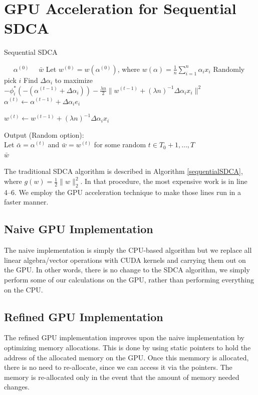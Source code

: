 \documentclass{article}
\begin{document}
\section{GPU Acceleration for Sequential SDCA}
\begin{algorithm}[H]
	\caption{Sequential SDCA}
	\label{sequentialSDCA}
	\begin{algorithmic}[1]
	\REQUIRE~~ $\alpha^{(0)}$
		\ENSURE~~$\bar{w}$
		\STATE Let $w^{(0)}=w(\alpha^{(0)})$, where $w(\alpha)=\frac{1}{n}\sum_{i=1}^{n}\alpha_ix_i$
		\STATE Randomly pick $i$
		\STATE Find $\Delta\alpha_i$ to maximize $-\phi_i^*(-(\alpha^{(t-1)}+\Delta\alpha_i))-\frac{\lambda n}{2}\|w^{(t-1)}+(\lambda n)^{-1}\Delta \alpha_i x_i\|^2$
		\STATE $\alpha^{(t)}\leftarrow\alpha^{(t-1)}+\Delta\alpha_ie_i$
		
		\STATE $w^{(t)}\leftarrow w^{(t-1)}+(\lambda n)^{-1}\Delta\alpha_i x_i$
		\ENDFOR
		
		\STATE Output (Random option):\\
		Let $\bar{\alpha}=\alpha^{(t)}$ and $\bar{w}=w^{(t)}$ for some random $t\in T_0+1,\ldots,T$\\
		\RETURN $\bar{w}$
		
	\end{algorithmic}
\end{algorithm}
The traditional SDCA algorithm \cite{shalev2013stochastic} is described in
Algorithm \ref{sequentialSDCA}, where $g(w)=\frac{1}{2}\|w\|_2^2$.  In that
procedure, the most expensive work is in line 4--6. We employ the GPU
acceleration technique to make those lines run in a faster manner.

\subsection{Naive GPU Implementation}
The naive implementation is simply the CPU-based algorithm but we replace all
linear algebra/vector operations with CUDA kernels and carrying them out on the
GPU. In other words, there is no change to the SDCA algorithm, we simply
perform some of our calculations on the GPU, rather than performing everything
on the CPU.

\subsection{Refined GPU Implementation}
The refined GPU implementation improves upon the naive implementation by
optimizing memory allocations. This is done by using static pointers to hold the
address of the allocated memory on the GPU. Once this memmory is allocated,
there is no need to re-allocate, since we can access it via the pointers. The
memory is re-allocated only in the event that the amount of memory needed
changes.
\end{document}
